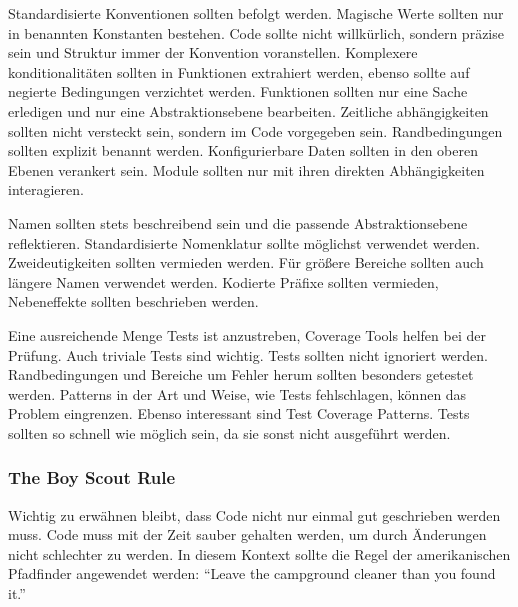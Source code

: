 Standardisierte Konventionen sollten befolgt werden.
Magische Werte sollten nur in benannten Konstanten bestehen.
Code sollte nicht willkürlich, sondern präzise sein und Struktur immer der Konvention voranstellen.
Komplexere konditionalitäten sollten in Funktionen extrahiert werden, ebenso sollte auf negierte Bedingungen verzichtet werden.
Funktionen sollten nur eine Sache erledigen und nur eine Abstraktionsebene bearbeiten.
Zeitliche abhängigkeiten sollten nicht versteckt sein, sondern im Code vorgegeben sein.
Randbedingungen sollten explizit benannt werden.
Konfigurierbare Daten sollten in den oberen Ebenen verankert sein.
Module sollten nur mit ihren direkten Abhängigkeiten interagieren.

Namen sollten stets beschreibend sein und die passende Abstraktionsebene reflektieren.
Standardisierte Nomenklatur sollte möglichst verwendet werden.
Zweideutigkeiten sollten vermieden werden.
Für größere Bereiche sollten auch längere Namen verwendet werden.
Kodierte Präfixe sollten vermieden, Nebeneffekte sollten beschrieben werden.

Eine ausreichende Menge Tests ist anzustreben, Coverage Tools helfen bei der Prüfung.
Auch triviale Tests sind wichtig.
Tests sollten nicht ignoriert werden.
Randbedingungen und Bereiche um Fehler herum sollten besonders getestet werden.
Patterns in der Art und Weise, wie Tests fehlschlagen, können das Problem eingrenzen.
Ebenso interessant sind Test Coverage Patterns.
Tests sollten so schnell wie möglich sein, da sie sonst nicht ausgeführt werden.

\subsubsection{The Boy Scout Rule}
Wichtig zu erwähnen bleibt, dass Code nicht nur einmal gut geschrieben werden muss.
Code muss mit der Zeit sauber gehalten werden, um durch Änderungen nicht schlechter zu werden.
In diesem Kontext sollte die Regel der amerikanischen Pfadfinder angewendet werden:
\enquote{Leave the campground cleaner than you found it.}
